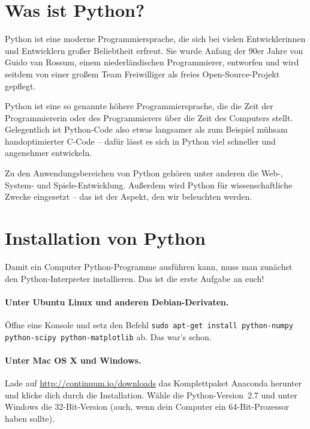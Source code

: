 \documentclass{blatt}
\begin{document}


\section{Was ist Python?}

Python ist eine moderne Programmiersprache, die sich bei vielen Entwicklerinnen
und Entwicklern großer Beliebtheit erfreut. Sie wurde Anfang der 90er Jahre von
Guido van Rossum, einem niederländischen Programmierer, entworfen und wird seitdem
von einer großem Team Freiwilliger als freies Open-Source-Projekt gepflegt.

Python ist eine so genannte höhere Programmiersprache, die die Zeit der
Programmiererin oder des Programmierers über die Zeit des Computers stellt.
Gelegentlich ist Python-Code also etwas langsamer als zum Beispiel mühsam
handoptimierter C-Code -- dafür lässt es sich in Python viel schneller und
angenehmer entwickeln.

Zu den Anwendungsbereichen von Python gehören unter anderen die Web-, System-
und Spiele-Entwicklung. Außerdem wird Python für wissenschaftliche Zwecke
eingesetzt -- das ist der Aspekt, den wir beleuchten werden.


\section{Installation von Python}

Damit ein Computer Python-Programme ausführen kann, muss man zunächst den
Python-Interpreter installieren. Das ist die erste Aufgabe an euch!

\paragraph{Unter Ubuntu Linux und anderen Debian-Derivaten.}
Öffne eine Konsole und setz den Befehl \texttt{sudo apt-get install
python-numpy python-scipy python-matplotlib} ab. Das war's schon.

\paragraph{Unter Mac OS X und Windows.} Lade auf
\url{http://continuum.io/downloads} das Komplettpaket Anaconda herunter und
klicke dich durch die Installation. Wähle die Python-Version~2.7 und unter
Windows die 32-Bit-Version (auch, wenn dein Computer ein 64-Bit-Prozessor haben
sollte).
\end{document}
